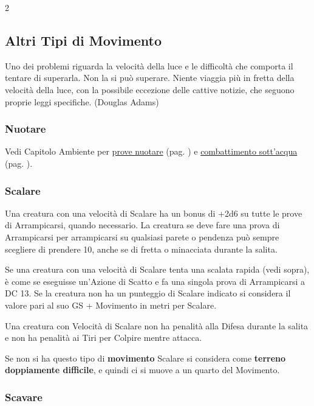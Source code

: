\begin{multicols}{2}
\subsection{Altri Tipi di Movimento}

\begin{enfasi}{
Uno dei problemi riguarda la velocità della luce e le difficoltà che comporta il tentare di superarla. Non la si può superare. Niente viaggia più in fretta della velocità della luce, con la possibile eccezione delle cattive notizie, che seguono proprie leggi specifiche. (Douglas Adams)
}\end{enfasi}

\label{altri-tipi-di-movimento}

\subsubsection{Nuotare}\label{nuotare}

Vedi Capitolo Ambiente per \hyperlink{pericoli-dellacqua}{prove nuotare} (pag. \pageref{pericoli-dellacqua}) e \hyperlink{combatteresottacqua}{combattimento sott'acqua} (pag. \pageref{combatteresottacqua}).

\subsubsection{Scalare}\label{scalare}

Una creatura con una velocità di Scalare ha un bonus di +2d6 su tutte le prove di Arrampicarsi, quando necessario. La creatura se deve fare una prova di Arrampicarsi per arrampicarsi su qualsiasi parete o pendenza può sempre scegliere di prendere 10, anche se di fretta o minacciata durante la salita.

Se una creatura con una velocità di Scalare tenta una scalata rapida (vedi sopra), è come se eseguisse un'Azione di Scatto e fa una singola prova di Arrampicarsi a DC 13. Se la creatura non ha un punteggio di Scalare indicato si considera il valore pari al suo GS + Movimento in metri per Scalare.

Una creatura con Velocità di Scalare non ha penalità alla Difesa durante la salita e non ha penalità ai Tiri per Colpire mentre attacca.

Se non si ha questo tipo di \textbf{movimento} Scalare si considera come \textbf{terreno doppiamente difficile}, e quindi ci si muove a un quarto del Movimento.

\subsubsection{Scavare}\label{scavare}


\end{multicols}
